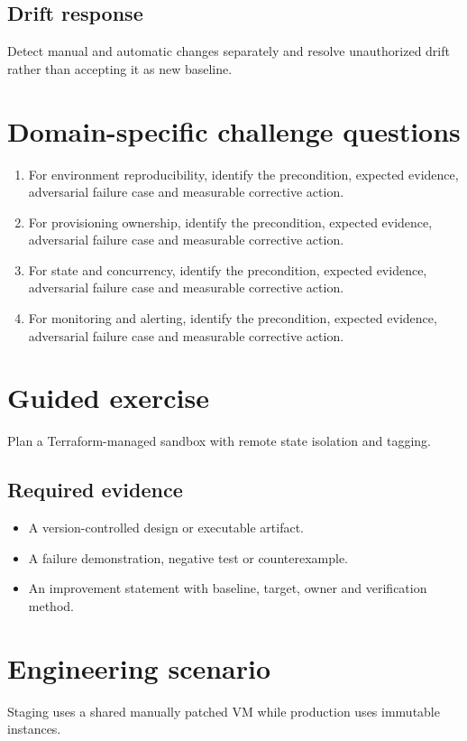 \documentclass[10pt,letterpaper]{article}
\begin{document}
\subsection{Drift response}
Detect manual and automatic changes separately and resolve unauthorized drift rather than accepting it as new baseline.

\section{Domain-specific challenge questions}
\begin{enumerate}
\item For environment reproducibility, identify the precondition, expected evidence, adversarial failure case and measurable corrective action.
\item For provisioning ownership, identify the precondition, expected evidence, adversarial failure case and measurable corrective action.
\item For state and concurrency, identify the precondition, expected evidence, adversarial failure case and measurable corrective action.
\item For monitoring and alerting, identify the precondition, expected evidence, adversarial failure case and measurable corrective action.
\end{enumerate}
\section{Guided exercise}
Plan a Terraform-managed sandbox with remote state isolation and tagging.

\subsection{Required evidence}
\begin{itemize}
\item A version-controlled design or executable artifact.
\item A failure demonstration, negative test or counterexample.
\item An improvement statement with baseline, target, owner and verification method.
\end{itemize}


\section{Engineering scenario}
Staging uses a shared manually patched VM while production uses immutable instances.
\end{document}
